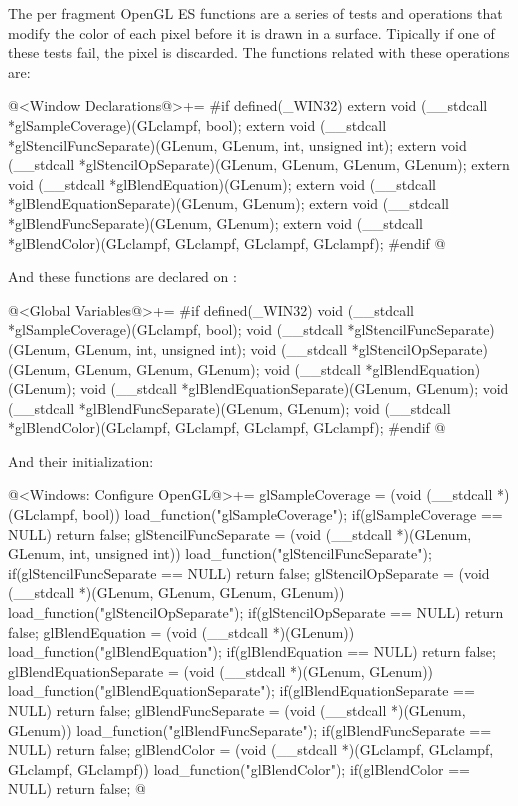 The per fragment OpenGL ES functions are a series of tests and
operations that modify the color of each pixel before it is drawn in a
surface. Tipically if one of these tests fail, the pixel is
discarded. The functions related with these operations are:

\iniciocodigo
@<Window Declarations@>+=
#if defined(_WIN32)
extern void (__stdcall *glSampleCoverage)(GLclampf, bool);
extern void (__stdcall *glStencilFuncSeparate)(GLenum, GLenum, int, unsigned int);
extern void (__stdcall *glStencilOpSeparate)(GLenum, GLenum, GLenum, GLenum);
extern void (__stdcall *glBlendEquation)(GLenum);
extern void (__stdcall *glBlendEquationSeparate)(GLenum, GLenum);
extern void (__stdcall *glBlendFuncSeparate)(GLenum, GLenum);
extern void (__stdcall *glBlendColor)(GLclampf, GLclampf, GLclampf, GLclampf);
#endif
@
\fimcodigo

And these functions are declared on :

\iniciocodigo
@<Global Variables@>+=
#if defined(_WIN32)
void (__stdcall *glSampleCoverage)(GLclampf, bool);
void (__stdcall *glStencilFuncSeparate)(GLenum, GLenum, int, unsigned int);
void (__stdcall *glStencilOpSeparate)(GLenum, GLenum, GLenum, GLenum);
void (__stdcall *glBlendEquation)(GLenum);
void (__stdcall *glBlendEquationSeparate)(GLenum, GLenum);
void (__stdcall *glBlendFuncSeparate)(GLenum, GLenum);
void (__stdcall *glBlendColor)(GLclampf, GLclampf, GLclampf, GLclampf);
#endif
@
\fimcodigo

And their initialization:

\iniciocodigo
@<Windows: Configure OpenGL@>+=
glSampleCoverage = (void (__stdcall *)(GLclampf, bool))
                        load_function("glSampleCoverage");
if(glSampleCoverage == NULL) return false;
glStencilFuncSeparate = (void (__stdcall *)(GLenum, GLenum, int, unsigned int))
                           load_function("glStencilFuncSeparate");
if(glStencilFuncSeparate == NULL) return false;
glStencilOpSeparate = (void (__stdcall *)(GLenum, GLenum, GLenum, GLenum))
                         load_function("glStencilOpSeparate");
if(glStencilOpSeparate == NULL) return false;
glBlendEquation = (void (__stdcall *)(GLenum)) load_function("glBlendEquation");
if(glBlendEquation == NULL) return false;
glBlendEquationSeparate = (void (__stdcall *)(GLenum, GLenum))
                            load_function("glBlendEquationSeparate");
if(glBlendEquationSeparate == NULL) return false;
glBlendFuncSeparate = (void (__stdcall *)(GLenum, GLenum))
                        load_function("glBlendFuncSeparate");
if(glBlendFuncSeparate == NULL) return false;
glBlendColor = (void (__stdcall *)(GLclampf, GLclampf, GLclampf, GLclampf))
                   load_function("glBlendColor");
if(glBlendColor == NULL) return false;
@
\fimcodigo


